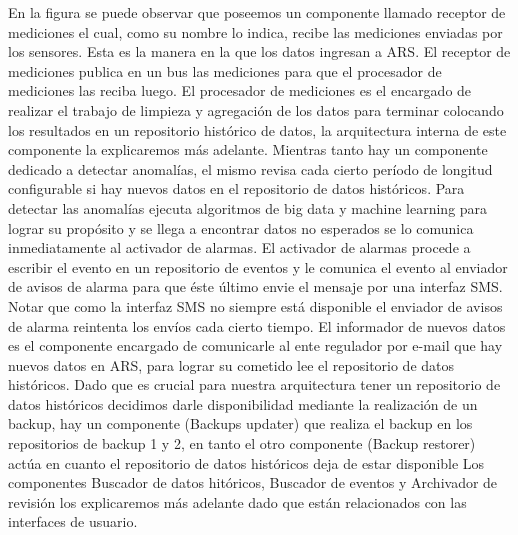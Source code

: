 En la figura se puede observar que poseemos un componente llamado receptor de mediciones el cual, como su nombre lo indica, recibe las mediciones enviadas por los sensores.
Esta es la manera en la que los datos ingresan a ARS. El receptor de mediciones publica en un bus las mediciones para que
el procesador de mediciones las reciba luego. El procesador de mediciones es el encargado de realizar el trabajo de limpieza y agregación de
los datos para terminar colocando los resultados en un repositorio histórico de datos, la arquitectura interna de este componente la explicaremos más adelante.
Mientras tanto hay un componente dedicado a detectar anomalías, el mismo revisa cada cierto período de longitud configurable si hay nuevos datos en el
repositorio de datos históricos. Para detectar las anomalías ejecuta algoritmos de big data y machine learning para lograr su propósito y se llega a encontrar
datos no esperados se lo comunica inmediatamente al activador de alarmas. El activador de alarmas procede a escribir el evento en un repositorio de eventos
y le comunica el evento al enviador de avisos de alarma para que éste último envie el mensaje por una interfaz SMS. Notar que como la
interfaz SMS no siempre está disponible el enviador de avisos de alarma reintenta los envíos cada cierto tiempo.
El informador de nuevos datos es el componente encargado de comunicarle al ente regulador por e-mail que hay nuevos datos en ARS, para lograr su cometido lee el repositorio de
datos históricos. Dado que es crucial para nuestra arquitectura tener un repositorio de datos históricos decidimos darle disponibilidad
mediante la realización de un backup, hay un componente (Backups updater) que realiza el backup en los repositorios de backup 1 y 2, en tanto el otro componente (Backup restorer) actúa en cuanto el repositorio
de datos históricos deja de estar disponible
Los componentes Buscador de datos hitóricos, Buscador de eventos y Archivador de revisión los explicaremos más adelante dado que están relacionados con las interfaces de usuario.
